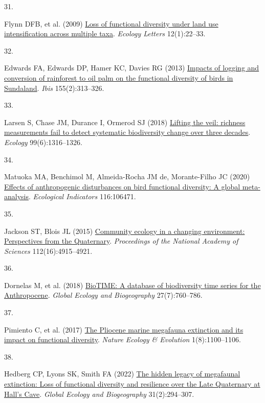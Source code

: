 \documentclass{article}
\newlength{\cslhangindent}
\newlength{\csllabelwidth}
\newlength{\cslentryspacingunit} %
\newenvironment{CSLReferences}[2] %
 {%
  \setlength{\parindent}{0pt}
  \ifodd #1
  \let\oldpar\par
  \def\par{\hangindent=\cslhangindent\oldpar}
  \fi
  \setlength{\parskip}{#2\cslentryspacingunit}
 }%
 {}
\newcommand{\CSLLeftMargin}[1]{\parbox[t]{\csllabelwidth}{#1}}
\newcommand{\CSLRightInline}[1]{\parbox[t]{\linewidth - \csllabelwidth}{#1}\break}
\begin{document}
\begin{CSLReferences}{0}{0}
\leavevmode{}%
\CSLLeftMargin{31. }%
\CSLRightInline{Flynn DFB, et al. (2009)
\href{https://doi.org/10.1111/j.1461-0248.2008.01255.x}{Loss of
functional diversity under land use intensification across multiple
taxa}. \emph{Ecology Letters} 12(1):22--33.}

\leavevmode{}%
\CSLLeftMargin{32. }%
\CSLRightInline{Edwards FA, Edwards DP, Hamer KC, Davies RG (2013)
\href{https://doi.org/10.1111/ibi.12027}{Impacts of logging and
conversion of rainforest to oil palm on the functional diversity of
birds in Sundaland}. \emph{Ibis} 155(2):313--326.}

\leavevmode{}%
\CSLLeftMargin{33. }%
\CSLRightInline{Larsen S, Chase JM, Durance I, Ormerod SJ (2018)
\href{https://doi.org/10.1002/ecy.2213}{Lifting the veil: richness
measurements fail to detect systematic biodiversity change over three
decades}. \emph{Ecology} 99(6):1316--1326.}

\leavevmode{}%
\CSLLeftMargin{34. }%
\CSLRightInline{Matuoka MA, Benchimol M, Almeida-Rocha JM de,
Morante-Filho JC (2020)
\href{https://doi.org/10.1016/j.ecolind.2020.106471}{Effects of
anthropogenic disturbances on bird functional diversity: A global
meta-analysis}. \emph{Ecological Indicators} 116:106471.}

\leavevmode{}%
\CSLLeftMargin{35. }%
\CSLRightInline{Jackson ST, Blois JL (2015)
\href{https://doi.org/10.1073/pnas.1403664111}{Community ecology in a
changing environment: Perspectives from the Quaternary}.
\emph{Proceedings of the National Academy of Sciences}
112(16):4915--4921.}

\leavevmode{}%
\CSLLeftMargin{36. }%
\CSLRightInline{Dornelas M, et al. (2018)
\href{https://doi.org/10.1111/geb.12729}{BioTIME: A database of
biodiversity time series for the Anthropocene}. \emph{Global Ecology and
Biogeography} 27(7):760--786.}

\leavevmode{}%
\CSLLeftMargin{37. }%
\CSLRightInline{Pimiento C, et al. (2017)
\href{https://doi.org/10.1038/s41559-017-0223-6}{The Pliocene marine
megafauna extinction and its impact on functional diversity}.
\emph{Nature Ecology \& Evolution} 1(8):1100--1106.}

\leavevmode{}%
\CSLLeftMargin{38. }%
\CSLRightInline{Hedberg CP, Lyons SK, Smith FA (2022)
\href{https://doi.org/10.1111/geb.13428}{The hidden legacy of megafaunal
extinction: Loss of functional diversity and resilience over the Late
Quaternary at Hall{'}s Cave}. \emph{Global Ecology and Biogeography}
31(2):294--307.}


\end{CSLReferences}
\end{document}
